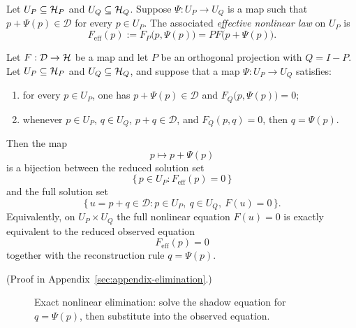 \begin{definition}
\label{def:nonlinear-effective-law}
Let $U_P\subseteq \mathcal{H}_P$ and $U_Q\subseteq \mathcal{H}_Q$. Suppose
$\Psi:U_P\to U_Q$ is a map such that $p+\Psi(p)\in\mathcal D$ for every
$p\in U_P$. The associated \emph{effective nonlinear law} on $U_P$ is
\[
F_{\mathrm{eff}}(p):=F_P\bigl(p,\Psi(p)\bigr)
=
P F\bigl(p+\Psi(p)\bigr).
\]
\end{definition}

\begin{theorem}
\label{thm:nonlinear-shadow-elimination}
Let $F:\mathcal D\to\mathcal{H}$ be a map and let $P$ be an orthogonal projection with
$Q=I-P$. Let $U_P\subseteq \mathcal{H}_P$ and $U_Q\subseteq \mathcal{H}_Q$, and suppose that a
map $\Psi:U_P\to U_Q$ satisfies:
\begin{enumerate}[label=(\roman*), leftmargin=2em, itemsep=0.2em]
\item for every $p\in U_P$, one has $p+\Psi(p)\in\mathcal D$ and
      $F_Q\bigl(p,\Psi(p)\bigr)=0$;
\item whenever $p\in U_P$, $q\in U_Q$, $p+q\in\mathcal D$, and
      $F_Q(p,q)=0$, then $q=\Psi(p)$.
\end{enumerate}
Then the map
\[
p \longmapsto p+\Psi(p)
\]
is a bijection between the reduced solution set
\[
\{\,p\in U_P : F_{\mathrm{eff}}(p)=0\,\}
\]
and the full solution set
\[
\{\,u=p+q\in\mathcal D : p\in U_P,\ q\in U_Q,\ F(u)=0\,\}.
\]
Equivalently, on $U_P\times U_Q$ the full nonlinear equation $F(u)=0$ is
exactly equivalent to the reduced observed equation
\[
F_{\mathrm{eff}}(p)=0
\]
together with the reconstruction rule $q=\Psi(p)$.
\end{theorem}

(Proof in Appendix~\ref{sec:appendix-elimination}.)

\begin{figure}[ht]
\centering
{}
\caption{Exact nonlinear elimination: solve the shadow equation for
$q=\Psi(p)$, then substitute into the observed equation.}
\label{fig:nonlinear-elimination}
\end{figure}

